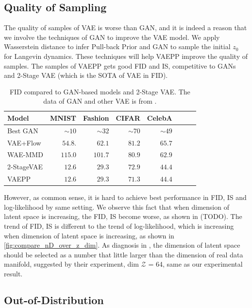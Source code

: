 \subsection{Quality of Sampling}
The quality of samples of VAE is worse than GAN, and it is indeed a reason that we involve the techniques of GAN to improve the VAE model. We apply Wasserstein distance to infer Pull-back Prior and GAN to sample the initial $z_0$ for Langevin dynamics. These techniques will help VAEPP improve the quality of samples. The samples of VAEPP gets good FID and IS, competitive to GANs and 2-Stage VAE (which is the SOTA of VAE in FID). 
\begin{table}[tb]
\centering
\begin{tabular}{lrrrrrrr}  
\toprule
Model & MNIST & Fashion & CIFAR & CelebA\\
\midrule
Best GAN   & $\sim10$& $\sim32$&$\sim70$& $\sim49$\\
VAE+Flow   & $54.8$. & $62.1$  & $81.2$ & $65.7$\\
WAE-MMD    & $115.0$ & $101.7$ & $80.9$ & $62.9$\\
2-StageVAE & $12.6$  & $29.3$  & $72.9$ & $44.4$\\
VAEPP      & $12.6$  & $29.3$  & $71.3$ & $44.4$ \\
\bottomrule
\end{tabular}
\caption{FID compared to GAN-based models and 2-Stage VAE. The data of GAN and other VAE is from \protect\cite{dai2019diagnosing}. }
\label{tab:compare_FID}
\end{table}
However, as common sense, it is hard to achieve best performance in FID, IS and log-likelihood by same setting. We observe this fact that when dimension of latent space is increasing, the FID, IS become worse, as shown in (TODO). The trend of FID, IS is different to the trend of log-likelihood, which is increasing when dimension of latent space is increasing, as shown in \cref{fig:compare_nD_over_z_dim}. As diagnosis in \cite{dai2019diagnosing}, the dimension of latent space should be selected as a number that little larger than the dimension of real data manifold, suggested by their experiment, dim $\mathcal{Z}$ = 64, same as our experimental result.  

\subsection{Out-of-Distribution}

